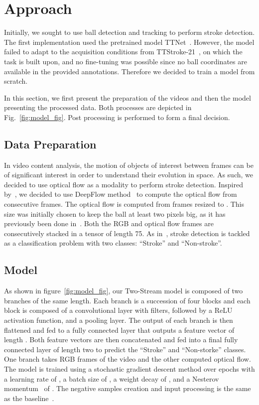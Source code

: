 \documentclass[sigconf]{acmart-me}
\begin{document}
\section{Approach}
\label{sec:approach}
Initially, we sought to use ball detection and tracking to perform stroke detection. The first implementation used the pretrained model TTNet~\cite{voeikov2020ttnet}. However, the model failed to adapt to the acquisition conditions from TTStroke-21~\cite{PeCBMI:2018}, on which the task is built upon, and no fine-tuning was possible since no ball coordinates are available in the provided annotations. Therefore we decided to train a model from scratch.
\par
In this section, we first present the preparation of the videos and then the model presenting the processed data. Both processes are depicted in Fig.~\ref{fig:model_fig}. Post processing is performed to form a final decision.


\subsection{Data Preparation}

In video content analysis, the motion of objects of interest between frames can be of significant interest in order to understand their evolution in space. As such, we decided to use optical flow as a modality to perform stroke detection. Inspired by~\cite{PeICIP19}, we decided to use DeepFlow method~\cite{deepflow} to compute the optical flow from consecutive frames. The optical flow is computed from frames resized to . This size was initially chosen to keep the ball at least two pixels big, as it has previously been done in~\cite{voeikov2020ttnet}. Both the RGB and optical flow frames are consecutively stacked in a tensor of length 75. As in~\cite{mediaeval/Martin21/baseline}, stroke detection is tackled as a classification problem with two classes: ``Stroke'' and ``Non-stroke''.


\subsection{Model}

As shown in figure~\ref{fig:model_fig}, our Two-Stream model is composed of two branches of the same length. Each branch is a succession of four blocks and each block is composed of a convolutional layer with  filters, followed by a ReLU activation function, and a  pooling layer. The output of each branch is then flattened and fed to a fully connected layer that outputs a feature vector of length . Both feature vectors are then concatenated and fed into a final fully connected layer of length two to predict the ``Stroke'' and ``Non-storke'' classes. One branch takes RGB frames of the video and the other computed optical flow. The model is trained using a stochastic gradient descent method over  epochs with a learning rate of , a batch size of , a weight decay of , and a Nesterov momentum~\cite{sutskever2013importance} of . The negative samples creation and input processing is the same as the baseline~\cite{mediaeval/Martin21/baseline}.
\end{document}
